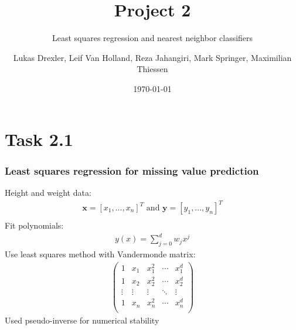 \documentclass{beamer}
\title[Project 1]{Project 2}
\subtitle{Least squares regression and nearest neighbor classifiers}
\author{Lukas Drexler, Leif Van Holland, Reza Jahangiri, Mark Springer, Maximilian Thiessen}
\institute[Universität Bonn]{Rheinische Friedrich-Wilhelms-Universität}
\date{\today}
\begin{document}
	
\begin{frame}%
	\titlepage
\end{frame}



\section{Task 2.1}

\begin{frame}
\frametitle{Least squares regression for missing value prediction}
Height and weight data:
\begin{align*}
	\mathbf{x} = [x_1,...,x_n]^T \text{ and } \mathbf{y} = [y_1,...,y_n]^T\\
\end{align*}
Fit polynomials:
\begin{align*}
	y(x) = \sum_{j=0}^{d}w_jx^j
\end{align*}
Use least squares method with Vandermonde matrix:
\begin{align*}
\begin{pmatrix}
1 & x_1 & x_1^2 & \cdots & x_1^d \\ 
1 & x_2 & x_2^2 & \cdots & x_2^d \\
\vdots & \vdots & \vdots & \ddots &\vdots \\
1 & x_n & x_n^2 & \cdots & x_n^d \\ 
\end{pmatrix}
\end{align*}
Used pseudo-inverse for numerical stability
\end{frame}
\end{document}
